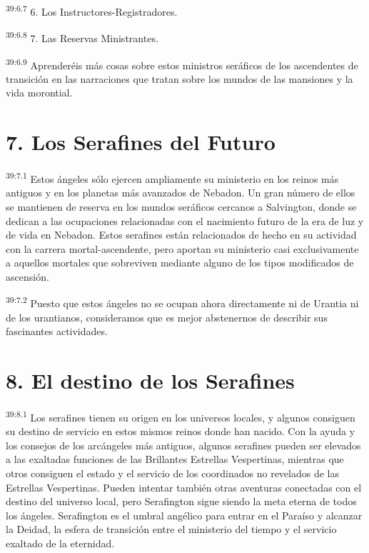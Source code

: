 \par
\textsuperscript{39:6.7} 6. Los Instructores-Registradores.

\par
\textsuperscript{39:6.8} 7. Las Reservas Ministrantes.

\par
\textsuperscript{39:6.9} Aprenderéis más cosas sobre estos ministros seráficos de los ascendentes de transición en las narraciones que tratan sobre los mundos de las mansiones y la vida morontial.

\section*{7. Los Serafines del Futuro}
\par
\textsuperscript{39:7.1} Estos ángeles sólo ejercen ampliamente su ministerio en los reinos más antiguos y en los planetas más avanzados de Nebadon. Un gran número de ellos se mantienen de reserva en los mundos seráficos cercanos a Salvington, donde se dedican a las ocupaciones relacionadas con el nacimiento futuro de la era de luz y de vida en Nebadon. Estos serafines están relacionados de hecho en su actividad con la carrera mortal-ascendente, pero aportan su ministerio casi exclusivamente a aquellos mortales que sobreviven mediante alguno de los tipos modificados de ascensión.

\par
\textsuperscript{39:7.2} Puesto que estos ángeles no se ocupan ahora directamente ni de Urantia ni de los urantianos, consideramos que es mejor abstenernos de describir sus fascinantes actividades.

\section*{8. El destino de los Serafines}
\par
\textsuperscript{39:8.1} Los serafines tienen su origen en los universos locales, y algunos consiguen su destino de servicio en estos mismos reinos donde han nacido. Con la ayuda y los consejos de los arcángeles más antiguos, algunos serafines pueden ser elevados a las exaltadas funciones de las Brillantes Estrellas Vespertinas, mientras que otros consiguen el estado y el servicio de los coordinados no revelados de las Estrellas Vespertinas. Pueden intentar también otras aventuras conectadas con el destino del universo local, pero Serafington sigue siendo la meta eterna de todos los ángeles. Serafington es el umbral angélico para entrar en el Paraíso y alcanzar la Deidad, la esfera de transición entre el ministerio del tiempo y el servicio exaltado de la eternidad.

